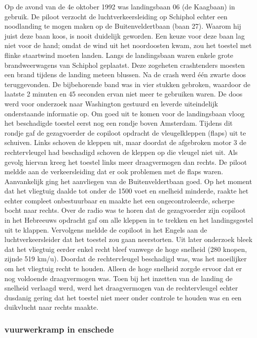 Op de avond van de 4e oktober 1992 was landingsbaan 06 (de Kaagbaan) in gebruik. De piloot verzocht de luchtverkeersleiding op Schiphol echter een noodlanding te mogen maken op de Buitenveldertbaan (baan 27). Waarom hij juist deze baan koos, is nooit duidelijk geworden. Een keuze voor deze baan lag niet voor de hand; omdat de wind uit het noordoosten kwam, zou het toestel met flinke staartwind moeten landen. Langs de landingsbaan waren enkele grote brandweerwagens van Schiphol geplaatst. Deze zogeheten crashtenders moesten een brand tijdens de landing meteen blussen. Na de crash werd één zwarte doos teruggevonden. De bijbehorende band was in vier stukken gebroken, waardoor de laatste 2 minuten en 45 seconden ervan niet meer te gebruiken waren. De doos werd voor onderzoek naar Washington gestuurd en leverde uiteindelijk onderstaande informatie op.
Om goed uit te komen voor de landingsbaan vloog het beschadigde toestel eerst nog een rondje boven Amsterdam. Tijdens dit rondje gaf de gezagvoerder de copiloot opdracht de vleugelkleppen (flaps) uit te schuiven. Links schoven de kleppen uit, maar doordat de afgebroken motor 3 de rechtervleugel had beschadigd schoven de kleppen op die vleugel niet uit. Als gevolg hiervan kreeg het toestel links meer draagvermogen dan rechts. De piloot meldde aan de verkeersleiding dat er ook problemen met de flaps waren.
Aanvankelijk ging het aanvliegen van de Buitenveldertbaan goed. Op het moment dat het vliegtuig daalde tot onder de 1500 voet en snelheid minderde, raakte het echter compleet onbestuurbaar en maakte het een ongecontroleerde, scherpe bocht naar rechts. Over de radio was te horen dat de gezagvoerder zijn copiloot in het Hebreeuws opdracht gaf om alle kleppen in te trekken en het landingsgestel uit te klappen. Vervolgens meldde de copiloot in het Engels aan de luchtverkeersleider dat het toestel zou gaan neerstorten. Uit later onderzoek bleek dat het vliegtuig eerder enkel recht bleef vanwege de hoge snelheid (280 knopen, zijnde 519 km/u). Doordat de rechtervleugel beschadigd was, was het moeilijker om het vliegtuig recht te houden. Alleen de hoge snelheid zorgde ervoor dat er nog voldoende draagvermogen was. Toen bij het inzetten van de landing de snelheid verlaagd werd, werd het draagvermogen van de rechtervleugel echter dusdanig gering dat het toestel niet meer onder controle te houden was en een duikvlucht naar rechts maakte.

\cite{aviationsafety04101992airplaneCrashBijlmer}
\subsubsection{vuurwerkramp in enschede }

